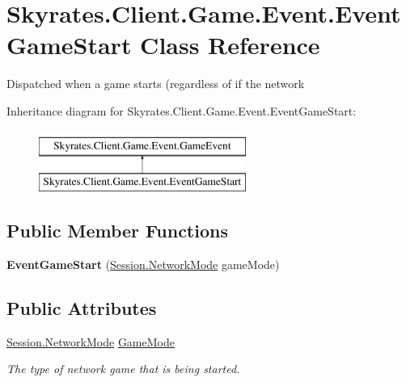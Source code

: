 \hypertarget{class_skyrates_1_1_client_1_1_game_1_1_event_1_1_event_game_start}{\section{Skyrates.\-Client.\-Game.\-Event.\-Event\-Game\-Start Class Reference}
\label{class_skyrates_1_1_client_1_1_game_1_1_event_1_1_event_game_start}
}


Dispatched when a game starts (regardless of if the network  


Inheritance diagram for Skyrates.\-Client.\-Game.\-Event.\-Event\-Game\-Start\-:\begin{figure}[H]
\begin{center}
\leavevmode
\includegraphics[height=2.000000cm]{class_skyrates_1_1_client_1_1_game_1_1_event_1_1_event_game_start}
\end{center}
\end{figure}
\subsection*{Public Member Functions}
\begin{DoxyCompactItemize}
\item 
\hypertarget{class_skyrates_1_1_client_1_1_game_1_1_event_1_1_event_game_start_ab52f3ae4fc5b6a2d89e92599b635d425}{{\bfseries Event\-Game\-Start} (\hyperlink{class_skyrates_1_1_common_1_1_network_1_1_session_ad2f4973bc77af540bd68a428e349fbff}{Session.\-Network\-Mode} game\-Mode)}\label{class_skyrates_1_1_client_1_1_game_1_1_event_1_1_event_game_start_ab52f3ae4fc5b6a2d89e92599b635d425}

\end{DoxyCompactItemize}
\subsection*{Public Attributes}
\begin{DoxyCompactItemize}
\item 
\hyperlink{class_skyrates_1_1_common_1_1_network_1_1_session_ad2f4973bc77af540bd68a428e349fbff}{Session.\-Network\-Mode} \hyperlink{class_skyrates_1_1_client_1_1_game_1_1_event_1_1_event_game_start_ad45d0af9906a79fd939914ce8bcf8b57}{Game\-Mode}
\begin{DoxyCompactList}\small\item\em The type of network game that is being started. \end{DoxyCompactList}\end{DoxyCompactItemize}


